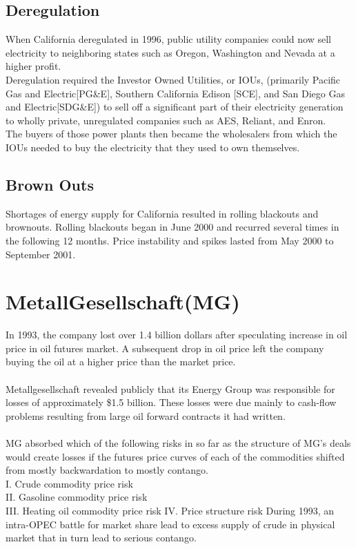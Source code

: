 \documentclass[12pt, a4paper]{report}
\begin{document}
\subsection{Deregulation}
When California deregulated in 1996, public utility companies
could now sell electricity to neighboring states such as Oregon,
Washington and Nevada at a higher profit.
\\
Deregulation required the Investor Owned Utilities, or IOUs,
(primarily Pacific Gas and Electric[PG\&E], Southern California
Edison [SCE], and San Diego Gas and Electric[SDG\&E]) to sell off
a significant part of their electricity generation to wholly
private, unregulated companies such as AES, Reliant, and Enron.\\
The buyers of those power plants then became the wholesalers from
which the IOUs needed to buy the electricity that they used to own
themselves.
\subsection{Brown Outs}
Shortages of energy supply for California resulted in rolling
blackouts and brownouts. Rolling blackouts began in June 2000 and
recurred several times in the following 12 months. Price
instability and spikes lasted from May 2000 to September 2001.


\section{MetallGesellschaft(MG)} In 1993, the company lost over
1.4 billion dollars after speculating increase in oil price in oil
futures market. A subsequent drop in oil price left the company
buying the oil at a higher price than the market price.\\\\
Metallgesellschaft revealed publicly that its Energy Group was
responsible for losses of approximately \$1.5 billion. These
losses were due mainly to cash-flow problems resulting from large
oil forward contracts it had written.
\\
\\
MG absorbed which of the following risks in so far as the
structure of MG's deals would create losses if the futures price
curves of each of the commodities shifted from mostly
backwardation to mostly contango. \\I. Crude commodity price risk
\\II. Gasoline commodity price risk \\III. Heating oil commodity
price risk IV. Price structure risk During 1993, an intra-OPEC
battle for market share lead to excess supply of crude in physical
market that in turn lead to serious contango.
\end{document}
